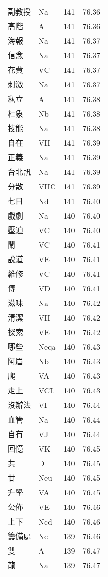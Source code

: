 \documentclass[twocolumn]{book}
\begin{document}
\begin{supertabular}{llrr}
副教授 & Na & 141 &  76.36\\
高階 & A & 141 &  76.36\\
海報 & Na & 141 &  76.37\\
信念 & Na & 141 &  76.37\\
花費 & VC & 141 &  76.37\\
刺激 & Na & 141 &  76.37\\
私立 & A & 141 &  76.38\\
杜象 & Nb & 141 &  76.38\\
技能 & Na & 141 &  76.38\\
自在 & VH & 141 &  76.39\\
正義 & Na & 141 &  76.39\\
台北訊 & Na & 141 &  76.39\\
分散 & VHC & 141 &  76.39\\
七日 & Nd & 141 &  76.40\\
戲劇 & Na & 140 &  76.40\\
壓迫 & VC & 140 &  76.40\\
鬧 & VC & 140 &  76.41\\
說道 & VE & 140 &  76.41\\
維修 & VC & 140 &  76.41\\
傳 & VD & 140 &  76.41\\
滋味 & Na & 140 &  76.42\\
清潔 & VH & 140 &  76.42\\
探索 & VE & 140 &  76.42\\
哪些 & Neqa & 140 &  76.43\\
阿眉 & Nb & 140 &  76.43\\
爬 & VA & 140 &  76.43\\
走上 & VCL & 140 &  76.43\\
沒辦法 & VI & 140 &  76.44\\
血管 & Na & 140 &  76.44\\
自有 & VJ & 140 &  76.44\\
回憶 & VK & 140 &  76.45\\
共 & D & 140 &  76.45\\
廿 & Neu & 140 &  76.45\\
升學 & VA & 140 &  76.45\\
公佈 & VE & 140 &  76.46\\
上下 & Ncd & 140 &  76.46\\
籌備處 & Nc & 139 &  76.46\\
雙 & A & 139 &  76.47\\
龍 & Na & 139 &  76.47\\

\end{supertabular}
\end{document}
